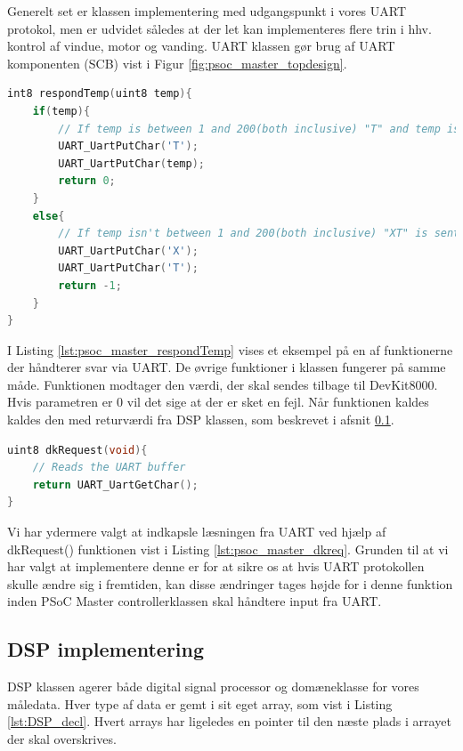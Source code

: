 Generelt set er klassen implementering med udgangspunkt i vores UART protokol, men er udvidet således at der let kan implementeres flere trin i hhv. kontrol af vindue, motor og vanding. UART klassen gør brug af UART komponenten (SCB) vist i Figur \ref{fig:psoc_master_topdesign}.

\begin{lstlisting}[language=C,caption=Implementering af respondTemp(),label=lst:psoc_master_respondTemp]
int8 respondTemp(uint8 temp){
    if(temp){
        // If temp is between 1 and 200(both inclusive) "T" and temp is sent to DevKit8000
        UART_UartPutChar('T');
        UART_UartPutChar(temp);
        return 0;
    }
    else{
        // If temp isn't between 1 and 200(both inclusive) "XT" is sent to DevKit8000
        UART_UartPutChar('X');
        UART_UartPutChar('T');
        return -1;
    }
}
\end{lstlisting}

I Listing \ref{lst:psoc_master_respondTemp} vises et eksempel på en af funktionerne der håndterer svar via UART. De øvrige funktioner i klassen fungerer på samme måde. Funktionen modtager den værdi, der skal sendes tilbage til DevKit8000. Hvis parametren er 0 vil det sige at der er sket en fejl. Når funktionen kaldes kaldes den med returværdi fra DSP klassen, som beskrevet i afsnit \ref{sec:DSP_impl}.

\begin{lstlisting}[language=C, caption=Implementering af dkRequest(), label=lst:psoc_master_dkreq]
uint8 dkRequest(void){
    // Reads the UART buffer
    return UART_UartGetChar();
}
\end{lstlisting}

Vi har ydermere valgt at indkapsle læsningen fra UART ved hjælp af dkRequest() funktionen vist i Listing \ref{lst:psoc_master_dkreq}. 
Grunden til at vi har valgt at implementere denne er for at sikre os at hvis UART protokollen skulle ændre sig i fremtiden, kan disse ændringer tages højde for i denne funktion inden PSoC Master controllerklassen skal håndtere input fra UART.

\subsection{DSP implementering}\label{sec:DSP_impl}
DSP klassen agerer både digital signal processor og domæneklasse for vores måledata. 
Hver type af data er gemt i sit eget array, som vist i Listing \ref{lst:DSP_decl}. 
Hvert arrays har ligeledes en pointer til den næste plads i arrayet der skal overskrives.


